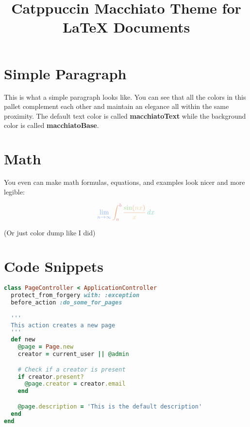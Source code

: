 \documentclass[12pt]{article}
\title{ \Huge \textbf{\textcolor{macchiatoPink}{Catppuccin Macchiato Theme for} \textcolor{macchiatoLavender}{\LaTeX{} Documents}} \vspace{-3em}}
\date{}
\begin{document}
\maketitle

\section{\textcolor{macchiatoSky}{Simple Paragraph}}
\textcolor{macchiatoYellow}{This is what a simple paragraph looks like.} You can see that all the colors in this pallet complement each other and maintain an elegance all within the same proximity. The default text color is called \textbf{\textcolor{macchiatoGreen}{macchiatoText}} while the background color is called \textbf{\textcolor{macchiatoGreen}{macchiatoBase}}.

\section{\textcolor{macchiatoSky}{Math}}

You even can make math formulas, equations, and examples look nicer and more legible:


\[\large{
    \textcolor{macchiatoBlue}{\lim_{{n \to \infty}} \textcolor{macchiatoPeach}{\int_{\textcolor{macchiatoRed}{a}}^{\textcolor{macchiatoRed}{b}} \frac{\textcolor{macchiatoGreen}{\sin}(\textcolor{macchiatoYellow}{nx})}{\textcolor{macchiatoYellow}{x}} \, \textcolor{macchiatoTeal}{dx}}}
}\]

\tiny{(Or just color dump like I did)}

\section{\textcolor{macchiatoSky}{Code Snippets}}

\begin{lstlisting}[language=Ruby,style=ruby_on_rails, caption={A ruby on rails code sample}]
class PageController < ApplicationController
  protect_from_forgery with: :exception
  before_action :do_some_for_pages

  '''
  This action creates a new page
  '''
  def new
    @page = Page.new
    creator = current_user || @admin

    # Check if a creator is present
    if creator.present?
      @page.creator = creator.email
    end

    @page.description = 'This is the default description'
  end
end
\end{lstlisting}
\end{document}
